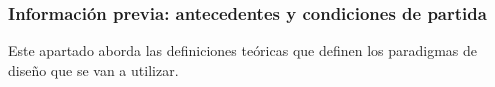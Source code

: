 
\subsubsection{Información previa: antecedentes y condiciones de partida}

Este apartado aborda las definiciones teóricas que definen los paradigmas de diseño que se van a utilizar.

